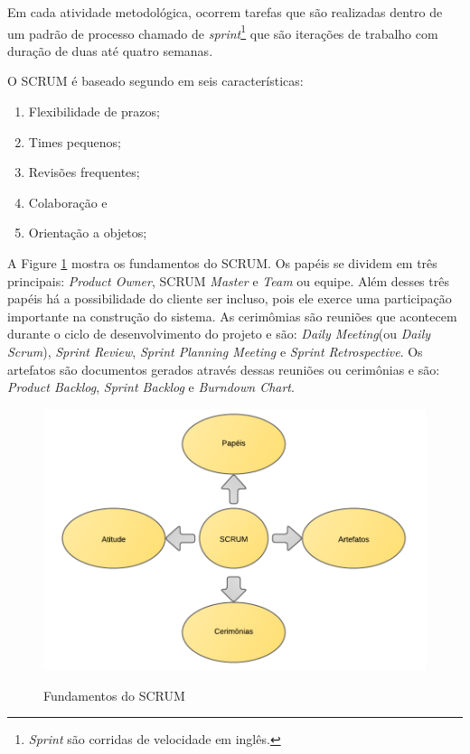 Em cada atividade metodológica, ocorrem tarefas que são realizadas dentro de um padrão de processo chamado de \textit{sprint}\footnote{\textit{Sprint} são corridas de velocidade em inglês.} que são iterações de trabalho com duração de duas até quatro semanas. \cite{pressman:11}

O SCRUM é baseado segundo  em seis características:

\begin{enumerate}
	\item Flexibilidade de prazos;
	\item Times pequenos;
	\item Revisões frequentes;
	\item Colaboração e
	\item Orientação a objetos;
\end{enumerate}

A Figure \ref{fig:scrumfund} mostra os fundamentos do SCRUM. Os papéis se dividem em três principais: \textit{Product Owner}, SCRUM \textit{Master} e \textit{Team} ou equipe. Além desses três papéis há a possibilidade do cliente ser incluso, pois ele exerce uma participação importante na construção do sistema. As cerimômias são reuniões que acontecem durante o ciclo de desenvolvimento do projeto e são: \textit{Daily Meeting}(ou \textit{Daily Scrum}), \textit{Sprint Review}, \textit{Sprint Planning Meeting} e \textit{Sprint Retrospective}. Os artefatos são documentos gerados através dessas reuniões ou cerimônias e são: \textit{Product Backlog}, \textit{Sprint Backlog} e \textit{Burndown Chart}. \cite{macedo:12}

\begin{figure}[htb!]
\begin{center}
\caption{Fundamentos do SCRUM}
\label{fig:scrumfund}
\includegraphics[width=13cm]{assets/scrum_papeis} \\
\end{center}
\end{figure}

